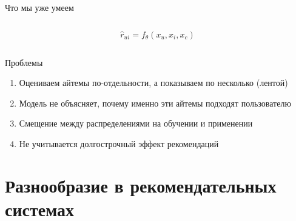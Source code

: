 \documentclass[11pt,aspectratio=169]{beamer}
\begin{document}
\begin{frame}{Что мы уже умеем}

\begin{columns}

\begin{column}{0.2\textwidth}

\end{column}

\begin{column}{0.5\textwidth} 

\begin{tcolorbox}[colback=info!5,colframe=info!80,title=]
\begin{Large}
\[
\hat r_{ui} = f_{\theta}(x_u, x_i, x_c)
\]
\end{Large}
\end{tcolorbox}

\end{column}

\begin{column}{0.2\textwidth} 

\end{column}
\end{columns}

\vfill

Проблемы
\begin{enumerate}[<+->]
\item Оцениваем айтемы по-отдельности, а показываем по несколько (лентой)
\item Модель не объясняет, почему именно эти айтемы подходят пользователю
\item Смещение между распределениями на обучении и применении
\item {\color{blue} Не учитывается долгострочный эффект рекомендаций}
\end{enumerate}

\end{frame}

\section{Разнообразие в рекомендательных системах}
\end{document}
